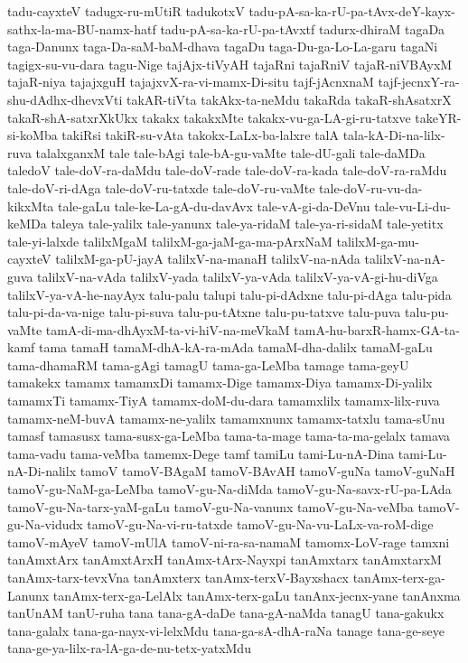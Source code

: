{tadu-cayxteV
tadugx-ru-mUtiR
tadukotxV
tadu-pA-sa-ka-rU-pa-tAvx-deY-kayx-sathx-la-ma-BU-namx-hatf
tadu-pA-sa-ka-rU-pa-tAvxtf
tadurx-dhiraM
tagaDa
taga-Danunx
taga-Da-saM-baM-dhava
tagaDu
taga-Du-ga-Lo-La-garu
tagaNi
tagigx-su-vu-dara
tagu-Nige
tajAjx-tiVyAH
tajaRni
tajaRniV
tajaR-niVBAyxM
tajaR-niya
tajajxguH
tajajxvX-ra-vi-mamx-Di-situ
tajf-jAcnxnaM
tajf-jecnxY-ra-shu-dAdhx-dhevxVti
takAR-tiVta
takAkx-ta-neMdu
takaRda
takaR-shAsatxrX
takaR-shA-satxrXkUkx
takakx
takakxMte
takakx-vu-ga-LA-gi-ru-tatxve
takeYR-si-koMba
takiRsi
takiR-su-vAta
takokx-LaLx-ba-lalxre
talA
tala-kA-Di-na-lilx-ruva
talalxganxM
tale
tale-bAgi
tale-bA-gu-vaMte
tale-dU-gali
tale-daMDa
taledoV
tale-doV-ra-daMdu
tale-doV-rade
tale-doV-ra-kada
tale-doV-ra-raMdu
tale-doV-ri-dAga
tale-doV-ru-tatxde
tale-doV-ru-vaMte
tale-doV-ru-vu-da-kikxMta
tale-gaLu
tale-ke-La-gA-du-davAvx
tale-vA-gi-da-DeVnu
tale-vu-Li-du-keMDa
taleya
tale-yalilx
tale-yanunx
tale-ya-ridaM
tale-ya-ri-sidaM
tale-yetitx
tale-yi-lalxde
talilxMgaM
talilxM-ga-jaM-ga-ma-pArxNaM
talilxM-ga-mu-cayxteV
talilxM-ga-pU-jayA
talilxV-na-manaH
talilxV-na-nAda
talilxV-na-nA-guva
talilxV-na-vAda
talilxV-yada
talilxV-ya-vAda
talilxV-ya-vA-gi-hu-diVga
talilxV-ya-vA-he-nayAyx
talu-palu
talupi
talu-pi-dAdxne
talu-pi-dAga
talu-pida
talu-pi-da-va-nige
talu-pi-suva
talu-pu-tAtxne
talu-pu-tatxve
talu-puva
talu-pu-vaMte
tamA-di-ma-dhAyxM-ta-vi-hiV-na-meVkaM
tamA-hu-barxR-hamx-GA-ta-kamf
tama
tamaH
tamaM-dhA-kA-ra-mAda
tamaM-dha-dalilx
tamaM-gaLu
tama-dhamaRM
tama-gAgi
tamagU
tama-ga-LeMba
tamage
tama-geyU
tamakekx
tamamx
tamamxDi
tamamx-Dige
tamamx-Diya
tamamx-Di-yalilx
tamamxTi
tamamx-TiyA
tamamx-doM-du-dara
tamamxlilx
tamamx-lilx-ruva
tamamx-neM-buvA
tamamx-ne-yalilx
tamamxnunx
tamamx-tatxlu
tama-sUnu
tamasf
tamasusx
tama-susx-ga-LeMba
tama-ta-mage
tama-ta-ma-gelalx
tamava
tama-vadu
tama-veMba
tamemx-Dege
tamf
tamiLu
tami-Lu-nA-Dina
tami-Lu-nA-Di-nalilx
tamoV
tamoV-BAgaM
tamoV-BAvAH
tamoV-guNa
tamoV-guNaH
tamoV-gu-NaM-ga-LeMba
tamoV-gu-Na-diMda
tamoV-gu-Na-savx-rU-pa-LAda
tamoV-gu-Na-tarx-yaM-gaLu
tamoV-gu-Na-vanunx
tamoV-gu-Na-veMba
tamoV-gu-Na-vidudx
tamoV-gu-Na-vi-ru-tatxde
tamoV-gu-Na-vu-LaLx-va-roM-dige
tamoV-mAyeV
tamoV-mUlA
tamoV-ni-ra-sa-namaM
tamomx-LoV-rage
tamxni
tanAmxtArx
tanAmxtArxH
tanAmx-tArx-Nayxpi
tanAmxtarx
tanAmxtarxM
tanAmx-tarx-tevxVna
tanAmxterx
tanAmx-terxV-Bayxshacx
tanAmx-terx-ga-Lanunx
tanAmx-terx-ga-LelAlx
tanAmx-terx-gaLu
tanAnx-jecnx-yane
tanAnxma
tanUnAM
tanU-ruha
tana
tana-gA-daDe
tana-gA-naMda
tanagU
tana-gakukx
tana-galalx
tana-ga-nayx-vi-lelxMdu
tana-ga-sA-dhA-raNa
tanage
tana-ge-seye
tana-ge-ya-lilx-ra-lA-ga-de-nu-tetx-yatxMdu
}
